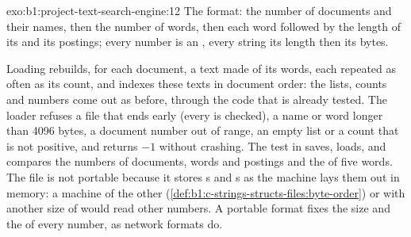 \begin{solution}{exo:b1:project-text-search-engine:12}
The format: the number of documents and their names, then the number of words, then each word followed by the length
of its  and its postings; every number is an , every string its length then its bytes.


Loading rebuilds, for each document, a text made of its words, each repeated as often as its count, and indexes these
texts in document order: the lists, counts and numbers come out as before, through the code that is already tested.
The loader refuses a file that ends early (every  is checked), a name or word longer than 4096 bytes, a
document number out of range, an empty list or a count that is not positive, and returns $-1$ without crashing. The test
in  saves, loads, and compares the numbers of documents, words and postings and the
 of five words. The file is not portable because it stores s and
s as the machine lays them out in memory: a machine of the other 
(\cref{def:b1:c-strings-structs-files:byte-order}) or with another size of  would read other numbers. A
portable format fixes the size and the  of every number, as network formats do.
\end{solution}
